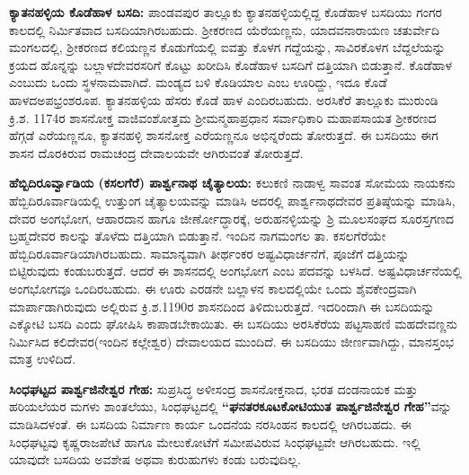 \textbf{ಕ್ಯಾತನಹಳ್ಳಿಯ ಕೊಡೆಹಾಳ ಬಸದಿ:} ಪಾಂಡವಪುರ ತಾಲ್ಲೂಕು ಕ್ಯಾತನಹಳ್ಳಿಯಲ್ಲಿದ್ದ ಕೊಡೆಹಾಳ ಬಸದಿಯು ಗಂಗರ ಕಾಲದಲ್ಲಿ ನಿರ್ಮಿತವಾದ ಬಸದಿಯಾಗಿರಬಹುದು. ಶ‍್ರೀಕರಣದ ಯೆರೆಯಣ್ಣನು, ಯಾದವನಾರಾಯಣ ಚತುರ್ವೇದಿ ಮಂಗಲದಲ್ಲಿ, ಶ‍್ರೀಕರಣದ ಕಲಿಯಣ್ಣನ ಕೊಡುಗೆಯಲ್ಲಿ ಐವತ್ತು ಕೊಳಗ ಗದ್ದೆಯನ್ನು, ಸಾವಿರಕೊಳಗ ಬೆದ್ದಲೆಯನ್ನು ಕ್ರಯದ ಹೊನ್ನನ್ನು ಬಲ್ಲಾಳದೇವರಸ\-ರಿಗೆ ಕೊಟ್ಟು ಖರೀದಿಸಿ ಕೊಡೆಹಾಳ ಬಸದಿಗೆ ದತ್ತಿಯಾಗಿ ಬಿಡುತ್ತಾನೆ. ಕೊಡೆಹಾಳ ಎಂಬುದು ಒಂದು ಸ್ಥಳನಾಮವಾಗಿದೆ. ಮಂಡ್ಯದ ಬಳಿ ಕೊಡಿಯಾಲ ಎಂಬ ಊರಿದ್ದು, ಇದೂ ಕೊಡೆ ಹಾಳದ\break ಅಪಭ್ರಂಶರೂಪ. ಕ್ಯಾತನಹಳ್ಳಿಯ ಹೆಸರು ಕೊಡೆ ಹಾಳ ಎಂದಿರಬಹುದು. ಅರಸಿಕೆರೆ ತಾಲ್ಲೂಕು ಮುರುಂಡಿ ಕ್ರಿ.ಶ. 1174ರ ಶಾಸನೋಕ್ತ ವಾಜಿವಂಶೋತ್ತಮ ಶ‍್ರೀಮನ್ಮಹಾಪ್ರಧಾನ ಸರ್ವಾಧಿಕಾರಿ ಮಹಾಪಸಾಯತ ಶ‍್ರೀಕರಣದ ಹೆಗ್ಗಡೆ ಎರೆಯಣ್ಣನೂ, ಕ್ಯಾತನಹಳ್ಳಿ ಶಾಸನೋಕ್ತ ಎರೆಯಣ್ಣನೂ ಅಭಿನ್ನರೆಂದು ತೋರುತ್ತದೆ. ಈ ಬಸದಿಯು ಈಗ ಶಾಸನ ದೊರಕಿರುವ ರಾಮಚಂದ್ರ ದೇವಾಲಯವೇ ಆಗಿರುವಂತೆ ತೋರುತ್ತದೆ.

\textbf{ಹೆಬ್ಬಿದಿರೂರ್ವ್ವಾಡಿಯ (ಕಸಲಗೆರೆ) ಪಾರ್ಶ್ವನಾಥ ಚೈತ್ಯಾಲಯ:} ಕಲುಕಣಿ ನಾಡಾಳ್ವ ಸಾವಂತ ಸೋಮೆಯ ನಾಯಕನು ಹೆಬ್ಬಿದಿರೂರ್ವಾಡಿಯಲ್ಲಿ ಉತ್ತುಂಗ ಚೈತ್ಯಾಲಯವನ್ನು ಮಾಡಿಸಿ ಅದರಲ್ಲಿ ಪಾರ್ಶ್ವನಾಥದೇವರ ಪ್ರತಿಷ್ಠೆಯನ್ನು ಮಾಡಿಸಿ, ದೇವರ ಅಂಗಭೋಗ, ಆಹಾರದಾನ ಹಾಗೂ ಜೀರ್ಣೋದ್ಧಾರಕ್ಕೆ, ಅರುಹನಳ್ಳಿಯನ್ನು ಶ್ರಿ ಮೂಲಸಂಘದ ಸೂರಸ್ತಗಣದ ಬ್ರಹ್ಮದೇವರ ಕಾಲನ್ನು ತೊಳೆದು ದತ್ತಿಯಾಗಿ ಬಿಡುತ್ತಾನೆ. ಇಂದಿನ ನಾಗಮಂಗಲ ತಾ. ಕಸಲಗೆರೆಯೇ ಹೆಬ್ಬಿದಿರೂರ್ವಾಡಿಯಾಗಿರ\-ಬಹುದು. ಸಾಮಾನ್ಯವಾಗಿ ತೀರ್ಥಂಕರ ಅಷ್ಟವಿಧಾರ್ಚನೆಗೆ, ಪೂಜೆಗೆ ದತ್ತಿಯನ್ನು ಬಿಟ್ಟಿರುವುದು ಕಂಡುಬರುತ್ತದೆ. ಆದರೆ ಈ ಶಾಸನದಲ್ಲಿ ಅಂಗಭೋಗ ಎಂಬ ಪದವನ್ನು ಬಳಸಿದೆ. ಅಷ್ಟವಿಧಾರ್ಚನೆಯಲ್ಲಿ ಅಂಗಭೋಗವೂ ಒಂದಿರಬಹುದು. ಈ ಊರು ಎರಡನೇ ಬಲ್ಲಾಳನ ಕಾಲದಲ್ಲಿಯೇ ಒಂದು ಶೈವಕೇಂದ್ರವಾಗಿ ಮಾರ್ಪಾಡಾಗಿರುವುದು ಅಲ್ಲಿರುವ ಕ್ರಿ.ಶ.1190ರ ಶಾಸನದಿಂದ ತಿಳಿದುಬರುತ್ತದೆ. ಇದರಿಂದಾಗಿ ಈ ಬಸದಿಯನ್ನು ಎಕ್ಕೋಟಿ ಬಸದಿ ಎಂದು ಘೋಷಿಸಿ ಕಾಪಾಡಬೇಕಾಯಿತು. ಈ ಬಸದಿಯು ಅರಸಿಕೆರೆಯ ಪಟ್ಟಸಾಹಣಿ ಮಹದೇವಣ್ಣನು ನಿರ್ಮಿಸಿದ ಕಲಿದೇವರ(ಇಂದಿನ ಕಲ್ಲೇಶ್ವರ) ದೇವಾಲಯದ ಮುಂದಿದೆ. ಈ ಬಸದಿಯು ಜೀರ್ಣವಾಗಿದ್ದು, ಮಾನಸ್ತಂಭ ಮಾತ್ರ ಉಳಿದಿದೆ.

\textbf{ಸಿಂಧಘಟ್ಟದ ಪಾರ್ಶ್ವಜಿನೇಶ್ವರ ಗೇಹ:} ಸುಪ್ರಸಿದ್ಧ ಅಳೀಸಂದ್ರ ಶಾಸನೋಕ್ತನಾದ, ಭರತ ದಂಡನಾಯಕ ಮತ್ತು ಹರಿಯಲೆಯರ ಮಗಳು ಶಾಂತಲೆಯು, ಸಿಂಧಘಟ್ಟದಲ್ಲಿ \textbf{“ಘನತರಕೂಟಕೋಟಿಯುತ ಪಾರ್ಶ್ವಜಿನೇಶ್ವರ ಗೇಹ”}ವನ್ನು ಮಾಡಿಸಿದ\-ಳಂತೆ. ಈ ಬಸದಿಯ ನಿರ್ಮಾಣ ಕಾರ್ಯ ಒಂದನೆಯ ನರಸಿಂಹನ ಕಾಲದಲ್ಲಿ ಆಗಿರಬಹದು. ಈ ಸಿಂಧಘಟ್ಟವು ಕೃಷ್ಣರಾಜಪೇಟೆ ಹಾಗೂ ಮೇಲುಕೋಟೆಗೆ ಸಮೀಪವಿರುವ ಸಿಂಧಘಟ್ಟವೇ ಆಗಿರಬಹುದು. ಇಲ್ಲಿ ಯಾವುದೇ ಬಸದಿಯ ಅವಶೇಷ ಅಥವಾ ಕುರುಹುಗಳು ಕಂಡು ಬರುವುದಿಲ್ಲ.


